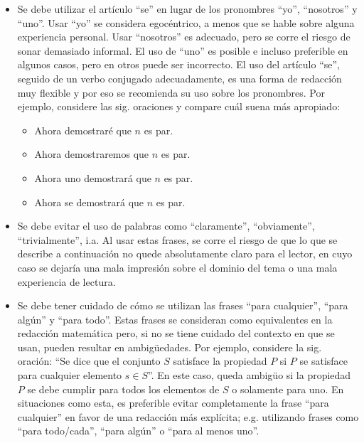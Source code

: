 \begin{itemize}

    \item Se debe utilizar el artículo ``se'' en lugar de los pronombres ``yo'',
    ``nosotros'' y ``uno''. Usar ``yo'' se considera egocéntrico,
    a menos que se hable sobre alguna experiencia personal. Usar ``nosotros''
    es adecuado, pero se corre el riesgo de sonar demasiado informal. El
    uso de ``uno'' es posible e incluso preferible en algunos casos,
    pero en otros puede ser incorrecto. El uso del artículo ``se'', seguido
    de un verbo conjugado adecuadamente, es una forma de redacción 
    muy flexible y por eso se recomienda su uso sobre los pronombres. 
    Por ejemplo, considere las sig. oraciones y compare cuál suena más apropiado:
    
    \begin{itemize}
        \item Ahora demostraré que $n$ es par.
        \item Ahora demostraremos que $n$ es par.
        \item Ahora uno demostrará que $n$ es par.
        \item Ahora se demostrará que $n$ es par.
    \end{itemize}
    
    \item Se debe evitar el uso de palabras como ``claramente'', ``obviamente'',
    ``trivialmente'', i.a. Al usar estas frases, 
    se corre el riesgo de que lo que se describe a continuación no quede 
    absolutamente claro para el lector, en cuyo caso se dejaría una mala impresión
    sobre el dominio del tema o una mala experiencia de lectura.
    
    \item Se debe tener cuidado de cómo se utilizan las frases ``para cualquier'',
    ``para algún'' y ``para todo''. Estas frases se consideran como
    equivalentes en la redacción matemática pero, si no se tiene
    cuidado del contexto en que se usan, pueden resultar en ambigüedades.
    Por ejemplo, considere la sig. oración: ``Se dice que el conjunto
    $S$ satisface la propiedad $P$ si $P$ se satisface para cualquier
    elemento $s\in S$''. En este caso, queda ambigüo si la propiedad
    $P$ se debe cumplir para todos los elementos de $S$ o solamente
    para uno. En situaciones como esta, es preferible evitar completamente
    la frase ``para cualquier'' en favor de una redacción más explícita;
    e.g. utilizando frases como ``para todo/cada'', ``para algún''
    o ``para al menos uno''.
    

\end{itemize}
